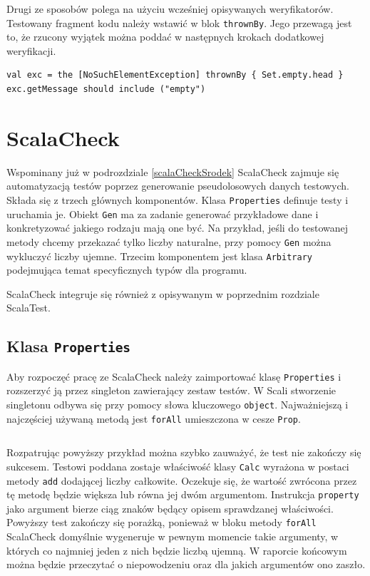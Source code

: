\documentclass[wimgr]{xmgr}
\begin{document}
Drugi ze sposobów polega na użyciu wcześniej opisywanych weryfikatorów. Testowany fragment kodu należy wstawić w blok \texttt{thrownBy}. Jego przewagą jest to, że rzucony wyjątek można poddać w następnych krokach dodatkowej weryfikacji.

\begin{verbatim}
val exc = the [NoSuchElementException] thrownBy { Set.empty.head }
exc.getMessage should include ("empty")
\end{verbatim}

\section{ScalaCheck}

Wspominany już w podrozdziale \ref{scalaCheckSrodek} ScalaCheck zajmuje się automatyzacją testów poprzez generowanie pseudolosowych danych testowych. Składa się z trzech głównych komponentów.
Klasa \texttt{Properties} definuje testy i uruchamia je. Obiekt \texttt{Gen} ma za zadanie generować przykładowe dane i konkretyzować jakiego rodzaju mają one być. Na przykład, jeśli do testowanej metody chcemy przekazać tylko liczby naturalne, przy pomocy \texttt{Gen} można wykluczyć liczby ujemne. Trzecim komponentem jest klasa \texttt{Arbitrary} podejmująca temat specyficznych typów dla programu.

ScalaCheck integruje się również z opisywanym w poprzednim rozdziale ScalaTest.

\subsection{Klasa \texttt{Properties}}

\label{scalaCheck:properties}

Aby rozpoczęć pracę ze ScalaCheck należy zaimportować klasę \texttt{Properties} i rozszerzyć ją przez singleton zawierający zestaw testów. W Scali stworzenie singletonu odbywa się przy pomocy słowa kluczowego \texttt{object}. Najważniejszą i najczęściej używaną metodą jest \texttt{forAll} umieszczona w cesze \texttt{Prop}.

\inputminted[fontsize=\small]{scala}{code/CalcTestBad.scala}

Rozpatrując powyższy przykład można szybko zauważyć, że test nie zakończy się sukcesem. Testowi poddana zostaje właściwość klasy \texttt{Calc} wyrażona w postaci metody \texttt{add} dodającej liczby całkowite. Oczekuje się, że wartość zwrócona przez tę metodę będzie większa lub równa jej dwóm argumentom. Instrukcja \texttt{property} jako argument bierze ciąg znaków będący opisem sprawdzanej właściwości. Powyższy test zakończy się porażką, ponieważ w bloku metody \texttt{forAll} ScalaCheck domyślnie wygeneruje w pewnym momencie takie argumenty, w których co najmniej jeden z nich będzie liczbą ujemną. W raporcie końcowym można będzie przeczytać o niepowodzeniu oraz dla jakich argumentów ono zaszło.
\end{document}
